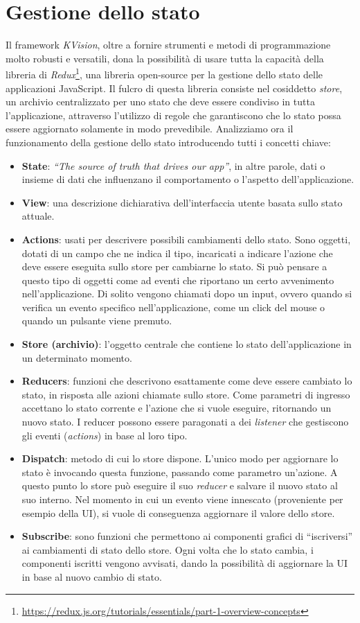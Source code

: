 \section{Gestione dello stato}\label{section:state-management}
Il framework \textit{KVision}, oltre a fornire strumenti e metodi di programmazione molto robusti e versatili, dona la possibilità di usare tutta la capacità della libreria di \textit{Redux}\footnote{\url{https://redux.js.org/tutorials/essentials/part-1-overview-concepts}}, una libreria open-source per la gestione dello stato delle applicazioni JavaScript. Il fulcro di questa libreria consiste nel cosiddetto \textit{store}, un archivio centralizzato per uno stato che deve essere condiviso in tutta l'applicazione, attraverso l'utilizzo di regole che garantiscono che lo stato possa essere aggiornato solamente in modo prevedibile. Analizziamo ora il funzionamento della gestione dello stato introducendo tutti i concetti chiave: 
\begin{itemize}	
	\item \textbf{State}: \textit{``The source of truth that drives our app''}, in altre parole, dati o insieme di dati che influenzano il comportamento o l'aspetto dell'applicazione. 	
	\item \textbf{View}: una descrizione dichiarativa dell'interfaccia utente basata sullo stato attuale.
	\item \textbf{Actions}: usati per descrivere possibili cambiamenti dello stato. Sono oggetti, dotati di un campo che ne indica il tipo, incaricati a indicare l'azione che deve essere eseguita sullo store per cambiarne lo stato. Si può pensare a questo tipo di oggetti come ad eventi che riportano un certo avvenimento nell'applicazione. Di solito vengono chiamati dopo un input, ovvero quando si verifica un evento specifico nell'applicazione, come un click del mouse o quando un pulsante viene premuto.
	\item \textbf{Store (archivio)}: l'oggetto centrale che contiene lo stato dell'applicazione in un determinato momento.
	\item \textbf{Reducers}: funzioni che descrivono esattamente come deve essere cambiato lo stato, in risposta alle azioni chiamate sullo store. Come parametri di ingresso accettano lo stato corrente e l'azione che si vuole eseguire, ritornando un nuovo stato. I reducer possono essere paragonati a dei \textit{listener} che gestiscono gli eventi (\textit{actions}) in base al loro tipo.
	\item \textbf{Dispatch}: metodo di cui lo store dispone. L'unico modo per aggiornare lo stato è invocando questa funzione, passando come parametro un'azione.  A questo punto lo store può eseguire il suo \textit{reducer} e salvare il nuovo stato al suo interno. Nel momento in cui un evento viene innescato (proveniente per esempio della \ac{UI}), si vuole di conseguenza aggiornare il valore dello store.
	\item \textbf{Subscribe}: sono funzioni che permettono ai componenti grafici di ``iscriversi'' ai cambiamenti di stato dello store. Ogni volta che lo stato cambia, i componenti iscritti vengono avvisati, dando la possibilità di aggiornare la \ac{UI} in base al nuovo cambio di stato.
\end{itemize}
